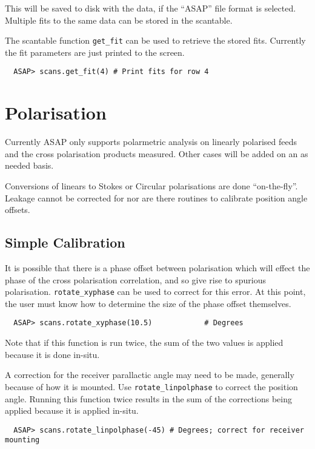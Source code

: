 \documentclass[11pt]{article}
\newcommand{\cmd}[1]{{\tt #1}}
\begin{document}
This will be saved to disk with the data, if the ``ASAP'' file format
is selected. Multiple fits to the same data can be stored in the
scantable.

The scantable function \cmd{get\_fit} can be used to retrieve the
stored fits. Currently the fit parameters are just printed to the
screen.

\begin{verbatim}
  ASAP> scans.get_fit(4) # Print fits for row 4
\end{verbatim}

\section{Polarisation}

Currently ASAP only supports polarmetric analysis
on linearly polarised feeds and the cross polarisation products
measured. Other cases will be added on an as needed basis.

Conversions of linears to Stokes or Circular polarisations are done
``on-the-fly''. Leakage cannot be corrected for nor are there routines
to calibrate position angle offsets.

\subsection{Simple Calibration}

It is possible that there is a phase
offset between polarisation which will effect the phase of the cross
polarisation correlation, and so give rise to spurious
polarisation. \cmd{rotate\_xyphase} can be used to correct for this
error. At this point, the user must know how to determine the size of
the phase offset themselves.

\begin{verbatim}
  ASAP> scans.rotate_xyphase(10.5)            # Degrees
\end{verbatim}

Note that if this function is run twice, the sum of the two values is
applied because it is done in-situ.

A correction for the receiver parallactic angle may need to be made,
generally because of how it is mounted. Use \cmd{rotate\_linpolphase}
to correct the position angle. Running this function twice results in
the sum of the corrections being applied because it is applied
in-situ.

\begin{verbatim}
  ASAP> scans.rotate_linpolphase(-45) # Degrees; correct for receiver mounting
\end{verbatim}
\end{document}
